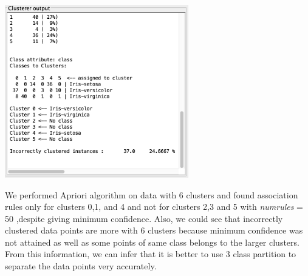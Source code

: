\documentclass[a4paper,10pt]{article}
\begin{document}
\begin{center}
  \includegraphics[width=80mm,scale=0.10]{kmeans_clustering_2.png}
\end{center}
We performed Apriori algorithm on data with 6 clusters and found association rules only for clusters 0,1, and 4
and not for clusters 2,3 and 5 with \textit{numrules} = 50 ,despite giving minimum confidence. Also, we could see that incorrectly clustered 
data points are more with 6 clusters because minimum confidence was not attained as well as some points of same 
class belongs to the larger clusters. From this information, we can infer that it is better to use 3 class 
partition to separate the data points very accurately.
\end{document}

